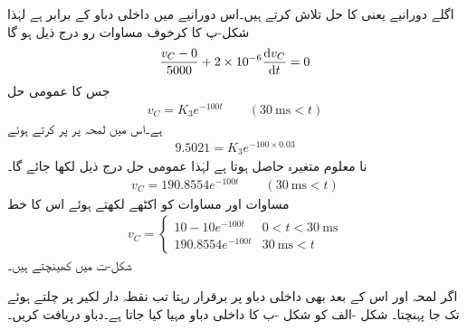 اگلے دورانیے یعنی  کا حل تلاش کرتے ہیں۔اس دورانیے میں داخلی دباو  کے برابر ہے لہٰذا شکل-پ کا کرخوف مساوات رو درج ذیل ہو گا
\begin{align*}
\frac{v_C-0}{5000}+2\times10^{-6}\frac{\dif v_C}{\dif t}=0
\end{align*}
جس کا عمومی حل
\begin{align*}
v_C=K_3e^{-100t} \quad \quad (\SI{30}{\milli\second}< t)
\end{align*}
ہے۔اس میں لمحہ  پر  پر کرتے  ہوئے
\begin{align*}
9.5021=K_3 e^{-100\times 0.03}
\end{align*}
نا معلوم متغیرہ  حاصل ہوتا ہے لہٰذا عمومی حل درج ذیل لکھا جائے گا۔
\begin{align}\label{مساوات_عارضی_مستطیل_مثال_حل_ب}
v_C=190.8554e^{-100t} \quad \quad (\SI{30}{\milli\second}< t)
\end{align}
مساوات  اور مساوات  کو اکٹھے لکھتے  ہوئے اس کا خط
\begin{align}
v_C=
\begin{cases}
10-10e^{-100t}& 0<t<\SI{30}{\milli\second}\\
190.8554e^{-100t} & \SI{30}{\milli\second}< t
\end{cases}
\end{align}
شکل-ت میں کھینچتے ہیں۔

اگر لمحہ  اور اس کے بعد بھی داخلی دباو  پر برقرار رہتا تب  نقطہ دار لکیر پر چلتے ہوئے  تک جا پہنچتا۔    
شکل -الف کو شکل -ب کا داخلی دباو مہیا کیا جاتا ہے۔دباو  دریافت کریں۔

